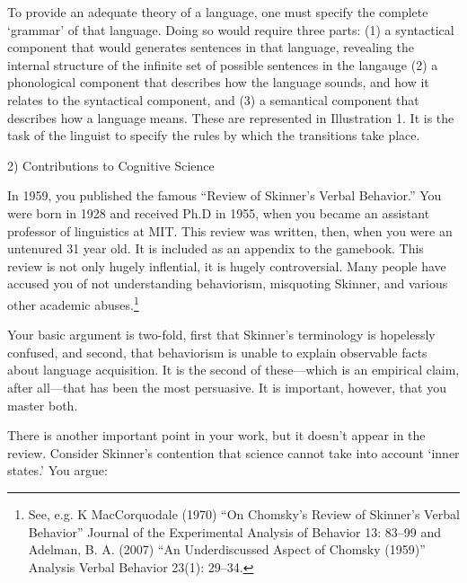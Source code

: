 \begin{refsection}
To provide an adequate theory of a language, one must specify the complete `grammar' of that language. Doing so would require three parts: (1) a syntactical component that would generates sentences in that language, revealing the internal structure of the infinite set of possible sentences in the langauge (2) a phonological component that describes how the language sounds, and how it relates to the syntactical component, and (3) a semantical component that describes how a language means. These are represented in Illustration 1. It is the task of the linguist to specify the rules by which the transitions take place.

2) Contributions to Cognitive Science

In 1959, you published the famous “Review of Skinner's Verbal Behavior.” You were born in 1928 and received Ph.D in 1955, when you became an assistant professor of linguistics at MIT. This review was written, then, when you were an untenured 31 year old. It is included as an appendix to the gamebook. This review is not only hugely inflential, it is hugely controversial. Many people have accused you of not understanding behaviorism, misquoting Skinner, and various other academic abuses.\footnote{See, e.g. K MacCorquodale (1970) “On Chomsky's Review of Skinner's Verbal Behavior” Journal of the Experimental Analysis of Behavior 13: 83--99 and Adelman, B. A. (2007) “An Underdiscussed Aspect of Chomsky (1959)” Analysis Verbal Behavior 23(1): 29--34.}

Your basic argument is two-fold, first that Skinner's terminology is hopelessly confused, and second, that behaviorism is unable to explain observable facts about language acquisition. It is the second of these—which is an empirical claim, after all—that has been the most persuasive. It is important, however, that you master both.

There is another important point in your work, but it doesn't appear in the review. Consider Skinner's contention that science cannot take into account `inner states.' You argue:

\begin{quote}


\end{quote}
\end{refsection}
